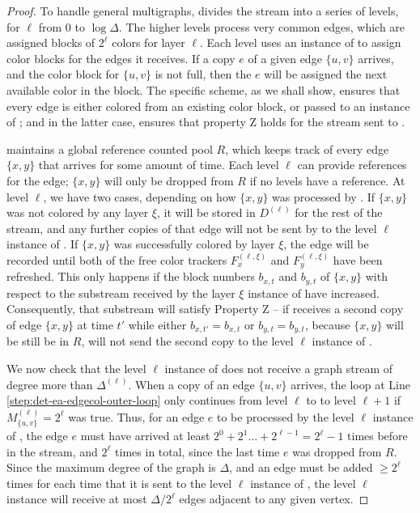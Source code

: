 \documentclass[10pt]{article}
\theoremstyle{definition}\newtheorem{definition}[lemma]{Definition}
\theoremstyle{remark}  \newtheorem*{remark}{Remark}
\newcommand{\pell}{{(\ell)}} %
\newcommand{\pellxi}{{(\ell,\xi)}} %
\begin{document}
\begin{proof}
  To handle general multigraphs,  divides the stream into
  a series of levels, for $\ell$ from $0$ to $\log \Delta$. The higher levels
  process very common edges, which are assigned blocks of $2^\ell$ colors for layer $\ell$. Each level uses an instance of  to assign color
  blocks for the edges it receives. If a copy $e$ of a given edge $\{u,v\}$ arrives,
  and the color block for $\{u,v\}$ is not full, then the $e$ will be assigned the
  next available color in the block. The specific scheme, as we shall show, ensures that every edge is either colored from an existing color block, or passed to an instance of ; and in the latter case, ensures that property
  Z holds for the stream sent to .
  
   maintains a global reference counted pool $R$, which
  keeps track of every edge $\{x,y\}$ that arrives for some amount of time. Each
  level $\ell$ can provide references for the edge; $\{x,y\}$ will only be dropped
  from $R$ if no levels have a reference. At level $\ell$, we have two cases,
  depending on how $\{x,y\}$ was processed by  . 
  If $\{x,y\}$ was not colored by any layer $\xi$, it will be stored in $D^\pell$ for the rest of the stream, and any further copies of that edge will not be sent by  to the level $\ell$ instance of . If $\{x,y\}$ was successfully colored by layer $\xi$, the edge will be recorded until both of the free color trackers $F_x^\pellxi$ and $F_y^\pellxi$
  have been refreshed. This only happens if the block numbers $b_{x,t}$ and $b_{y,t}$ of $\{x,y\}$ with respect to the substream received by the layer $\xi$ instance of  have increased. Consequently, that substream will satisfy Property Z -- if  receives a second copy of edge $\{x,y\}$ at time $t'$ while either $b_{x,t'} = b_{x,t}$ or $b_{y,t} = b_{y,t}$, because $\{x,y\}$ will be still be in $R$,  will not send the second copy to the level $\ell$ instance of .
  
  We now check that the level $\ell$ instance of  does not receive a graph stream of degree more than $\Delta^\pell$. When a copy of an edge $\{u,v\}$ arrives, the loop at Line \ref{step:det-ea-edgecol-outer-loop} only continues from level $\ell$ to to level $\ell + 1$ if $M_{\{u,v\}}^\pell = 2^\ell$ was true. Thus, for an edge $e$ to be processed by the level $\ell$ instance of , the edge $e$ must have arrived at least $2^0 + 2^1 \ldots + 2^{\ell-1} = 2^{\ell} - 1$ times before in the stream, and $2^\ell$ times in total, since the last time $e$ was dropped from $R$. Since the maximum degree of the graph is $\Delta$, and an edge must be added $\ge 2^\ell$ times for each time that
  it is sent to the level $\ell$ instance of , the level $\ell$ instance will
  receive at most $\Delta/2^\ell$ edges adjacent to any given vertex.


\end{proof}
\end{document}
